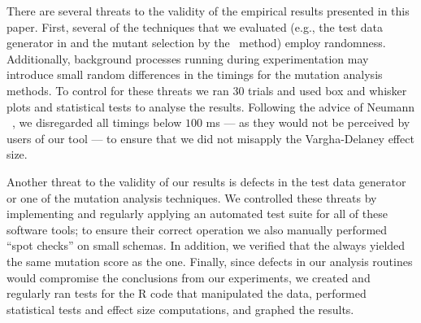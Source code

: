 

 There are several threats to the validity of the empirical results presented in this paper. First, several of the techniques that we evaluated (e.g., the test data generator in \SA and the mutant selection by the \tcm~method) employ randomness. Additionally, background processes running during experimentation may introduce small random differences in the timings for the mutation analysis methods. To control for these threats we ran 30 trials and used box and whisker plots and statistical tests to analyse the results. Following the advice of Neumann \etal~\cite{Neumann2015}, we disregarded all timings below $100$ ms --- as they would not be perceived by users of our tool --- to ensure that we did not misapply the Vargha-Delaney effect size.



Another threat to the validity of our results is defects in the test data generator or one of the mutation analysis techniques. We controlled these threats by implementing and regularly applying an automated test suite for all of these software tools; to ensure their correct operation we also manually performed ``spot checks'' on small schemas. In addition, we verified that the \vma always yielded the same mutation score as the \Original one. Finally, since defects in our analysis routines would compromise the conclusions from our experiments, we created and regularly ran tests for the R code that manipulated the data, performed statistical tests and effect size computations, and graphed the results.



